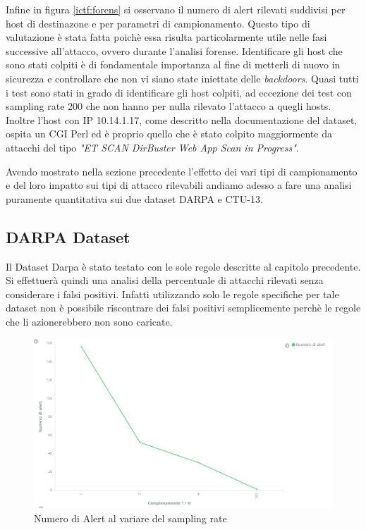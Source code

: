\documentclass[12pt,a4paper,openright,twoside]{report}
\begin{document}
Infine in figura \ref{ictf:forens} si osservano il numero di alert rilevati suddivisi per host di destinazone
e per parametri di campionamento. Questo tipo di valutazione \`e stata fatta poich\`e essa risulta particolarmente
utile nelle fasi successive all'attacco, ovvero durante l'analisi forense. Identificare gli
host che sono stati colpiti \`e di fondamentale importanza al fine di metterli di nuovo
in sicurezza e controllare che non vi siano state iniettate delle {\it backdoors}.
Quasi tutti i test sono stati in grado di identificare gli host colpiti, ad eccezione
dei test con sampling rate 200 che non hanno per nulla rilevato l'attacco a quegli hosts.
Inoltre l'host con IP 10.14.1.17, come descritto nella documentazione del dataset,
ospita un CGI Perl ed \`e proprio quello che \`e stato
colpito maggiormente da attacchi del tipo  {\it "ET SCAN DirBuster Web App Scan in Progress"}.

\clearpage

Avendo mostrato nella sezione precedente l'effetto dei vari tipi di campionamento
e del loro impatto sui tipi di attacco rilevabili andiamo adesso a fare una analisi
puramente quantitativa sui due dataset DARPA e CTU-13.


\subsection{DARPA Dataset}

Il Dataset Darpa \`e stato testato con le sole regole descritte al capitolo precedente.
Si effettuer\`a quindi una analisi della percentuale di attacchi rilevati senza considerare i
falsi positivi. Infatti utilizzando solo le regole specifiche per tale dataset non
\`e possibile riscontrare dei falsi positivi semplicemente perch\`e le regole che li azionerebbero
non sono caricate.

\begin{figure}[h!]
\begin{center}                          %
  \includegraphics[width=\textwidth]{images/DARPA-sampling-rate.png}
  \caption{Numero di Alert al variare del sampling rate}\label{darpa:s}
\end{center}
\end{figure}
\end{document}
